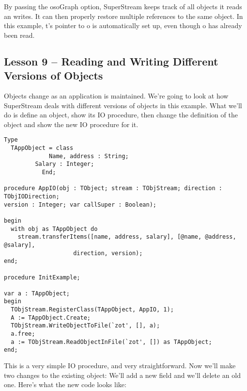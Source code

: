 \documentclass{report}
\begin{document}
By passing the osoGraph option, SuperStream keeps track of all objects it
reads an writes. It can then properly restore multiple references to the
same object. In this example, t's pointer to o is automatically set up, even
though o has already been read.

\subsection{Lesson 9 -- Reading and Writing Different Versions of Objects}

Objects change as an application is maintained. We're going to look at how
SuperStream deals with different versions of objects in this example.  What
we'll do is define an object, show its IO procedure, then change the
definition of the object and show the new IO procedure for it.

\begin{lstlisting}
Type
  TAppObject = class
	         Name, address : String;
		 Salary : Integer;
	       End;

procedure AppIO(obj : TObject; stream : TObjStream; direction : TObjIODirection;
version : Integer; var callSuper : Boolean);

begin
  with obj as TAppObject do
    stream.transferItems([name, address, salary], [@name, @address, @salary],
					direction, version);
end;

procedure InitExample;

var a : TAppObject;
begin
  TObjStream.RegisterClass(TAppObject, AppIO, 1);
  A := TAppObject.Create;
  TObjStream.WriteObjectToFile(`zot', [], a);
  a.free;
  a := TObjStream.ReadObjectInFile(`zot', []) as TAppObject;
end;
\end{lstlisting}

This is a very simple IO procedure, and very straightforward.  Now we'll
make two changes to the existing object: We'll add a new field and we'll
delete an old one. Here's what the new code looks like:
\end{document}
